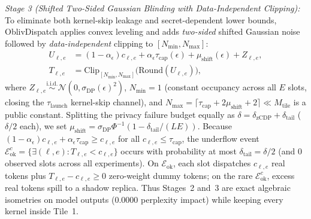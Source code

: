 \documentclass[10pt,journal,compsoc]{IEEEtran}
\def\OD{OblivDispatch}%
\theoremstyle{definition}
\theoremstyle{remark}
\newcommand{\OD}{\textsc{OblivDispatch}}
\begin{document}
\emph{Stage 3 (Shifted Two-Sided Gaussian Blinding with Data-Independent Clipping):} To eliminate both kernel-skip leakage and secret-dependent lower bounds, \OD{} applies convex leveling and adds \emph{two-sided} shifted Gaussian noise followed by \emph{data-independent} clipping to $[N_{\min}, N_{\max}]$:
\begin{align}\label{eq:dp_pad}
  U_{\ell, e} &= (1 - \alpha_\epsilon) c_{\ell, e} + \alpha_\epsilon \tau_{\mathrm{cap}}(\epsilon) + \mu_{\mathrm{shift}}(\epsilon) + Z_{\ell, e}, \nonumber\\
  T_{\ell, e} &= \mathrm{Clip}_{[N_{\min}, N_{\max}]}\!\big(\mathrm{Round}(U_{\ell, e})\big),
\end{align}
where $Z_{\ell, e} \stackrel{\mathrm{i.i.d.}}{\sim} \mathcal{N}(0, \sigma_{\mathrm{DP}}(\epsilon)^2)$, $N_{\min} = 1$ (constant occupancy across all $E$ slots, closing the $\tau_{\mathrm{launch}}$ kernel-skip channel), and $N_{\max} = \lceil \tau_{\mathrm{cap}} + 2\mu_{\mathrm{shift}} + 2 \rceil \ll M_{\mathrm{tile}}$ is a public constant. Splitting the privacy failure budget equally as $\delta = \delta_{\mathrm{zCDP}} + \delta_{\mathrm{tail}}$ ($\delta/2$ each), we set $\mu_{\mathrm{shift}} = \sigma_{\mathrm{DP}} \Phi^{-1}(1 - \delta_{\mathrm{tail}}/(LE))$. Because $(1-\alpha_\epsilon)c_{\ell,e} + \alpha_\epsilon\tau_{\mathrm{cap}} \ge c_{\ell,e}$ for all $c_{\ell,e} \le \tau_{\mathrm{cap}}$, the underflow event $\mathcal{E}_{\mathrm{ok}}^c = \{\exists (\ell, e) : T_{\ell, e} < c_{\ell, e}\}$ occurs with probability at most $\delta_{\mathrm{tail}} = \delta/2$ (and $0$ observed slots across all experiments). On $\mathcal{E}_{\mathrm{ok}}$, each slot dispatches $c_{\ell, e}$ real tokens plus $T_{\ell, e} - c_{\ell, e} \ge 0$ zero-weight dummy tokens; on the rare $\mathcal{E}_{\mathrm{ok}}^c$, excess real tokens spill to a shadow replica. Thus Stages~2 and~3 are exact algebraic isometries on model outputs ($0.0000$ perplexity impact) while keeping every kernel inside Tile~1.
\end{document}
